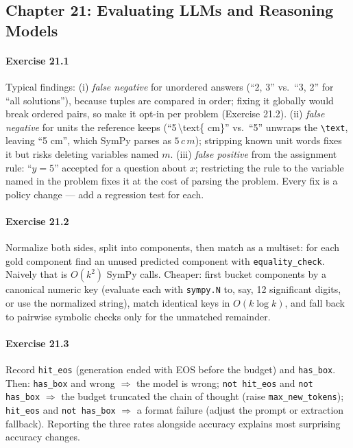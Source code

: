 \subsection*{Chapter 21: Evaluating LLMs and Reasoning Models}

\paragraph{Exercise 21.1} Typical findings: (i) \emph{false negative} for unordered answers
(``2, 3'' vs.\ ``3, 2'' for ``all solutions''), because tuples are compared in order; fixing it
globally would break ordered pairs, so make it opt-in per problem (Exercise 21.2). (ii) \emph{false
negative} for units the reference keeps (``5\,\textbackslash text\{ cm\}'' vs.\ ``5'' unwraps the
\texttt{\textbackslash text}, leaving ``5 cm'', which SymPy parses as $5\,c\,m$); stripping known
unit words fixes it but risks deleting variables named $m$. (iii) \emph{false positive} from the
assignment rule: ``$y = 5$'' accepted for a question about $x$; restricting the rule to the variable
named in the problem fixes it at the cost of parsing the problem. Every fix is a policy change ---
add a regression test for each.

\paragraph{Exercise 21.2} Normalize both sides, split into components, then match as a multiset:
for each gold component find an unused predicted component with \texttt{equality\_check}. Naively
that is $O(k^2)$ SymPy calls. Cheaper: first bucket components by a canonical numeric key (evaluate
each with \texttt{sympy.N} to, say, 12 significant digits, or use the normalized string), match
identical keys in $O(k \log k)$, and fall back to pairwise symbolic checks only for the
unmatched remainder.

\paragraph{Exercise 21.3} Record \texttt{hit\_eos} (generation ended with EOS before the budget) and
\texttt{has\_box}. Then: \texttt{has\_box} and wrong $\Rightarrow$ the model is wrong;
\texttt{not hit\_eos} and \texttt{not has\_box} $\Rightarrow$ the budget truncated the chain of
thought (raise \texttt{max\_new\_tokens}); \texttt{hit\_eos} and \texttt{not has\_box}
$\Rightarrow$ a format failure (adjust the prompt or extraction fallback). Reporting the three rates
alongside accuracy explains most surprising accuracy changes.

